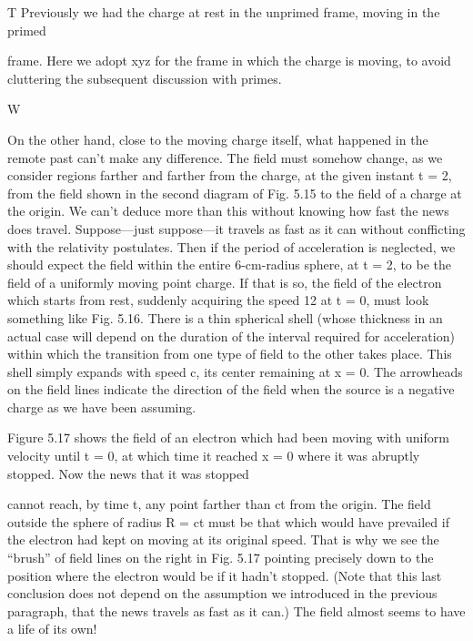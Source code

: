 T Previously we had the charge at rest in the unprimed frame, moving in the primed

frame. Here we adopt xyz for the frame in which the charge is moving, to avoid cluttering
the subsequent discussion with primes.

 

W

On the other hand, close to the moving charge itself, what happened
in the remote past can't make any difference. The field must
somehow change, as we consider regions farther and farther from
the charge, at the given instant t = 2, from the field shown in the
second diagram of Fig. 5.15 to the field of a charge at the origin. We
can't deduce more than this without knowing how fast the news does
travel. Suppose---just suppose---it travels as fast as it can without
confficting with the relativity postulates. Then if the period of acceleration
is neglected, we should expect the field within the entire
6-cm-radius sphere, at t = 2, to be the field of a uniformly moving
point charge. If that is so, the field of the electron which starts from
rest, suddenly acquiring the speed 12 at t = 0, must look something
like Fig. 5.16. There is a thin spherical shell (whose thickness in an
actual case will depend on the duration of the interval required for
acceleration) within which the transition from one type of field to
the other takes place. This shell simply expands with speed c, its
center remaining at x = 0. The arrowheads on the field lines indicate
the direction of the field when the source is a negative charge
as we have been assuming.

Figure 5.17 shows the field of an electron which had been moving
with uniform velocity until t = 0, at which time it reached x = 0
where it was abruptly stopped. Now the news that it was stopped

  

cannot reach, by time t, any point farther than ct from the origin.
The field outside the sphere of radius R = ct must be that which
would have prevailed if the electron had kept on moving at its original
speed. That is why we see the ``brush'' of field lines on the right
in Fig. 5.17 pointing precisely down to the position where the electron
would be if it hadn't stopped. (Note that this last conclusion
does not depend on the assumption we introduced in the previous
paragraph, that the news travels as fast as it can.) The field almost
seems to have a life of its own!

